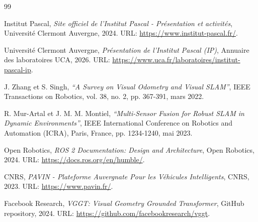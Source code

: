 \documentclass[12pt,a4paper,oneside]{report}
\begin{document}
\begin{thebibliography}{99}

\vspace{1cm}

Institut Pascal, \textit{Site officiel de l'Institut Pascal - Présentation et activités}, Université Clermont Auvergne, 2024. URL: \url{https://www.institut-pascal.fr/}.

\vspace{0.5cm}

Université Clermont Auvergne, \textit{Présentation de l'Institut Pascal (IP)}, Annuaire des laboratoires UCA, 2026. URL: \url{https://www.uca.fr/laboratoires/institut-pascal-ip}.

\vspace{0.5cm}

J. Zhang et S. Singh, \textit{``A Survey on Visual Odometry and Visual SLAM''}, IEEE Transactions on Robotics, vol. 38, no. 2, pp. 367-391, mars 2022.

\vspace{0.5cm}

R. Mur-Artal et J. M. M. Montiel, \textit{``Multi-Sensor Fusion for Robust SLAM in Dynamic Environments''}, IEEE International Conference on Robotics and Automation (ICRA), Paris, France, pp. 1234-1240, mai 2023.

\vspace{0.5cm}

Open Robotics, \textit{ROS 2 Documentation: Design and Architecture}, Open Robotics, 2024. URL: \url{https://docs.ros.org/en/humble/}.

\vspace{0.5cm}

CNRS, \textit{PAVIN - Plateforme Auvergnate Pour les Véhicules Intelligents}, CNRS, 2023. URL: \url{https://www.pavin.fr/}.

\vspace{0.5cm}

Facebook Research, \textit{VGGT: Visual Geometry Grounded Transformer}, GitHub repository, 2024. URL: \url{https://github.com/facebookresearch/vggt}.

\vspace{0.5cm}


\end{thebibliography}
\end{document}
